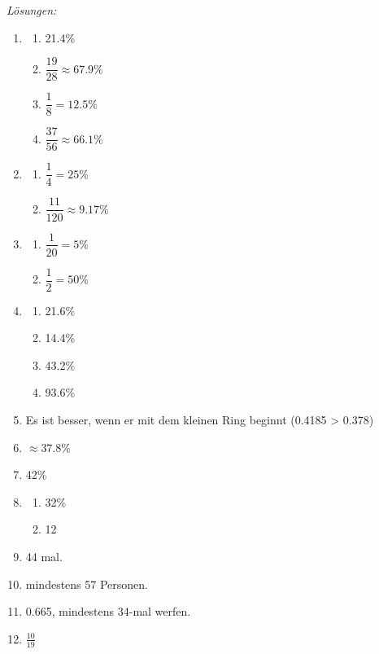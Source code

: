\clearpage
\emph{Lösungen:}
\begin{enumerate}
  \item
        \begin{enumerate}
          \item 21.4\%
          \item \( \dfrac{19}{28} \approx 67.9\% \)
          \item \( \dfrac{1}{8} = 12.5\% \)
          \item \( \dfrac{37}{56} \approx 66.1\% \)
        \end{enumerate}

  \item
        \begin{enumerate}
          \item \( \dfrac{1}{4} = 25\% \)
          \item \( \dfrac{11}{120} \approx 9.17\% \)
        \end{enumerate}

  \item
        \begin{enumerate}
          \item \( \dfrac{1}{20} = 5\% \)
          \item \( \dfrac{1}{2} = 50\% \)
        \end{enumerate}

  \item
        \begin{enumerate}
          \item 21.6\%
          \item 14.4\%
          \item 43.2\%
          \item 93.6\%
        \end{enumerate}


  \item Es ist besser, wenn er mit dem kleinen Ring beginnt (0.4185 > 0.378)
  \item \(\approx 37.8\%\)
  \item 42\%
  \item \begin{enumerate}
          \item 32\%
          \item 12
        \end{enumerate}
  \item 44 mal.
  \item mindestens 57 Personen.
  \item 0.665, mindestens 34-mal werfen.
  \item \(\frac{10}{19}\)
\end{enumerate}








